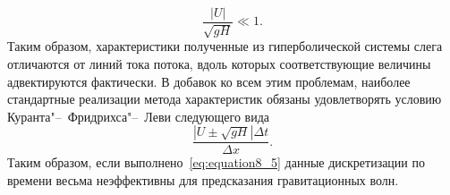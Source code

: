 %
\begin{equation}
\label{eq:equation8_5}
\frac{|U|}{\sqrt{gH}} \ll 1.
\end{equation}
%
Таким образом, характеристики полученные из гиперболической системы слега отличаются от линий тока потока, вдоль которых соответствующие величины адвектируются фактически. В добавок ко всем этим проблемам, наиболее стандартные реализации метода характеристик обязаны удовлетворять условию Куранта"--~Фридрихса"--~Леви следующего вида
%
\begin{equation}
\label{eq:equation8_6}
\frac{|U\pm\sqrt{gH}|\Delta t}{\Delta x}.
\end{equation}
%
Таким образом, если выполнено~\eqref{eq:equation8_5} данные дискретизации по времени весьма неэффективны для предсказания гравитационных волн.

